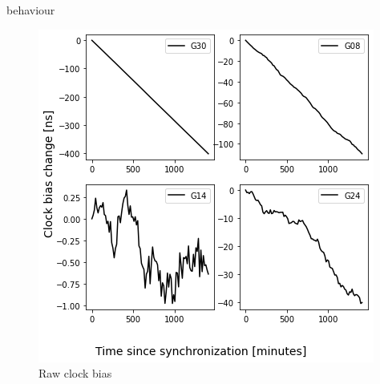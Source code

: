 \documentclass{kybernetika}
\begin{document}
behaviour
\begin{figure}[ht] 
\centering
\includegraphics[width=\textwidth]{figures/bias_raw}
\caption{Raw clock bias}
\label{fig:bias_raw}
\end{figure}

\end{document}

